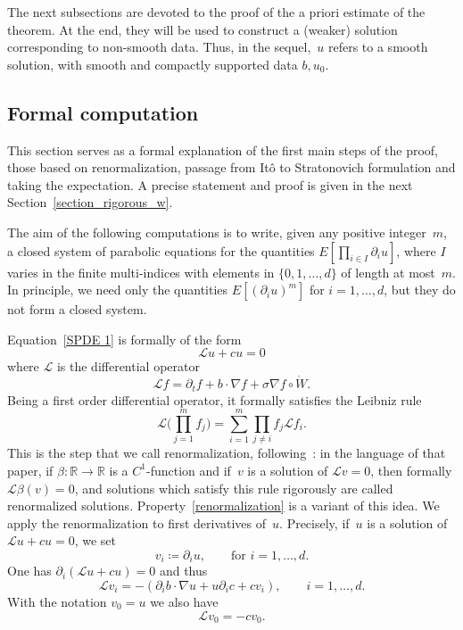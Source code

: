 \documentclass[a4paper,10pt]{article}
\newcommand\1{\mathbbm{1}}
\numberwithin{equation}{section}
\begin{document}
The next subsections are devoted to the proof of the a priori estimate of the theorem. At the end, they will be used to construct a (weaker) solution
corresponding to non-smooth data. Thus, in the sequel,~$u$ refers to a smooth solution, with smooth and compactly supported data $b,u_{0}$.

\subsection{Formal computation}

This section serves as a formal explanation of the first main steps of the proof, those based on renormalization, passage from It\^{o} to Stratonovich
formulation and taking the expectation. A precise statement and proof is given in the next Section~\ref{section_rigorous_w}. 

The aim of the following computations is to write, given any positive integer~$m$, a closed system of parabolic equations for the quantities $E[ \prod_{i\in I}\partial_{i}u]$, where $I$ varies in the finite multi-indices with elements in $\{0,1,\ldots, d\}$ of length at most~$m$. In principle, we need only the quantities $E[(\partial_{i}u)^{m}]$ for $i=1,\ldots,d$, but they do not form a closed system.

Equation~\eqref{SPDE 1} is formally of the form
\begin{equation*}
\mathcal{L}u+cu=0
\end{equation*}
where $\mathcal{L}$ is the differential operator
\begin{equation*}
\mathcal{L}f=\partial_{t}f+b\cdot\nabla f+\sigma\nabla f\circ\dot{W}.
\end{equation*}
Being a first order differential operator, it formally satisfies the Leibniz rule
\begin{equation}
\mathcal{L} \Big(\prod_{j=1}^{m}f_{j}\Big)  =\sum_{i=1}^{m}\prod_{j\neq
i}f_{j}\mathcal{L}f_{i}. \label{renormalization} 
\end{equation}
This is the step that we call renormalization, following~\cite{DIPELI89}: in the language of that paper, if $\beta \colon \mathbb{R\rightarrow R}$ is a $C^{1}$-function and if~$v$ is a solution of $\mathcal{L}v=0$, then formally $\mathcal{L}\beta(v)=0$, and solutions which satisfy this rule rigorously are called renormalized solutions. Property~\eqref{renormalization} is a variant of this idea. We apply the renormalization to first derivatives of~$u$. Precisely, if~$u$ is a solution of $\mathcal{L}u+cu=0$, we set
\begin{equation*}
v_{i}\coloneqq \partial_{i}u,\qquad \text{for } i=1,\ldots,d.
\end{equation*}
One has $\partial_{i}(\mathcal{L}u+cu)  =0$ and thus
\begin{equation*}
\mathcal{L}v_{i}=-(\partial_{i}b\cdot\nabla u+u\partial_{i} 
c+cv_{i})  ,\qquad i=1,\ldots,d.
\end{equation*}
With the notation $v_{0}=u$ we also have 
\begin{equation*}
\mathcal{L}v_{0}=-cv_{0}.
\end{equation*}
\end{document}
